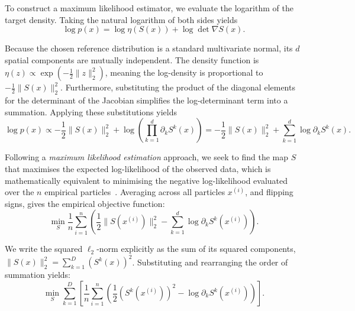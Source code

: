 To construct a maximum likelihood estimator, we evaluate the logarithm of the target density. Taking the natural logarithm of both sides yields
\begin{equation*}
    \log p(x) = \log \eta(S(x)) + \log \det \nabla S(x).
    \label{eq:log_density_initial}
\end{equation*}

Because the chosen reference distribution is a standard multivariate normal, its $d$ spatial components are mutually independent. The density function is $\eta(z) \propto \exp\left(-\frac{1}{2} \|z\|_{2}^2\right)$, meaning the log-density is proportional to $-\frac{1}{2}\|S(x)\|_{2}^2$. Furthermore, substituting the product of the diagonal elements for the determinant of the Jacobian simplifies the log-determinant term into a summation. Applying these substitutions yields
\begin{equation*}
    \log p(x) \propto -\frac{1}{2} \|S(x)\|_{2}^2 + \log \left( \prod_{k=1}^d \partial_k S^k(x) \right) = -\frac{1}{2} \|S(x)\|_{2}^2 + \sum_{k=1}^d \log \partial_k S^k(x).
    \label{eq:log_density_expanded}
\end{equation*}

Following a \emph{maximum likelihood estimation} approach, we seek to find the map $S$ that maximises the expected log-likelihood of the observed data, which is mathematically equivalent to minimising the negative log-likelihood evaluated over the $n$ empirical particles~\cite{Baptista2022}. Averaging across all particles $x^{(i)}$, and flipping signs, gives the empirical objective function:
\begin{equation*}
    \min_{S} \frac{1}{n} \sum_{i=1}^n \left( \frac{1}{2} \|S(x^{(i)})\|_{2}^2 - \sum_{k=1}^d \log \partial_k S^k(x^{(i)}) \right).
    \label{eq:full_negative_log_likelihood}
\end{equation*}

We write the squared $\ell_2$-norm explicitly as the sum of its squared components, $\|S(x)\|_{2}^2 = \sum_{k=1}^D (S^k(x))^2$. Substituting and rearranging the order of summation yields:
\begin{equation*}
    \min_{S} \sum_{k=1}^D \left[ \frac{1}{n} \sum_{i=1}^n \left( \frac{1}{2} (S^k(x^{(i)}))^2 - \log \partial_k S^k(x^{(i)}) \right) \right].
    \label{eq:decoupled_likelihood}
\end{equation*}

